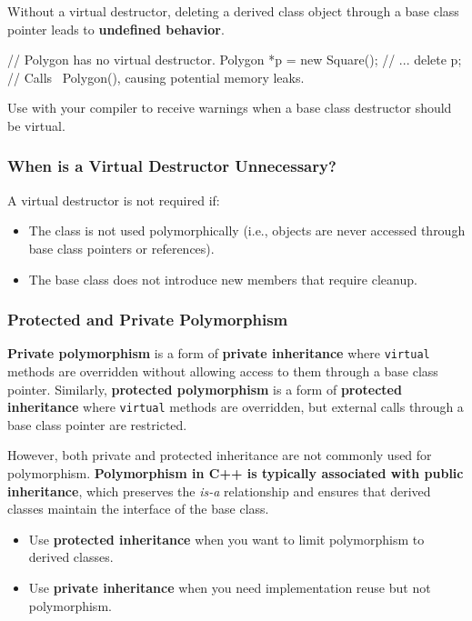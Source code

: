 Without a virtual destructor, deleting a derived class object through a base class pointer leads to \textbf{undefined behavior}.

\begin{codeblock}[language=C++, numbers=none]
// Polygon has no virtual destructor.
Polygon *p = new Square();
// ...
delete p; // Calls ~Polygon(), causing potential memory leaks.
\end{codeblock}

\begin{tipsblock}
    Use  with your compiler to receive warnings when a base class destructor should be virtual.
\end{tipsblock}

\subsubsection{When is a Virtual Destructor Unnecessary?}

A virtual destructor is not required if:
\begin{itemize}
    \item The class is not used polymorphically (i.e., objects are never accessed through base class pointers or references).
    \item The base class does not introduce new members that require cleanup.
\end{itemize}

\subsubsection{Protected and Private Polymorphism}

\textbf{Private polymorphism} is a form of \textbf{private inheritance} where \texttt{virtual} methods are overridden without allowing access to them through a base class pointer. Similarly, \textbf{protected polymorphism} is a form of \textbf{protected inheritance} where \texttt{virtual} methods are overridden, but external calls through a base class pointer are restricted.

However, both private and protected inheritance are not commonly used for polymorphism. \textbf{Polymorphism in C++ is typically associated with public inheritance}, which preserves the \textit{is-a} relationship and ensures that derived classes maintain the interface of the base class.

\begin{observationblock}
    \begin{itemize}
        \item Use \textbf{protected inheritance} when you want to limit polymorphism to derived classes.
        \item Use \textbf{private inheritance} when you need implementation reuse but not polymorphism.
    \end{itemize}
\end{observationblock}

